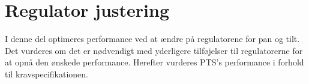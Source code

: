 \part{Regulator justering}
I denne del optimeres performance ved at ændre på regulatorene for pan og tilt. 
Det vurderes om det er nødvendigt med yderligere tilføjelser til regulatorerne 
for at opnå den ønskede performance.
Herefter vurderes PTS's performance i forhold til kravspecifikationen.

%
